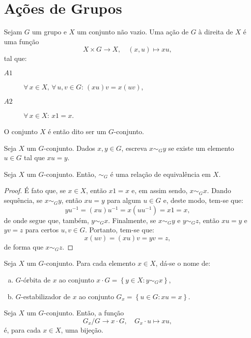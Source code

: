 \section{Ações de Grupos}\label{sec:ações-de-grupos}

\begin{definition}
  Sejam $G$ um grupo e $X$ um conjunto não vazio. Uma ação de $G$ à direita de $X$ é uma função
  \[
    X\times{G}\to{X},\quad{(x,u)\mapsto{xu}},
  \]
  tal que:
  \begin{description}
    \item[$A1$] $\forall\,x\in{X},\,\forall\,u,v\in{G}$: $(xu)v=x(uv)$,
    \item[$A2$] $\forall\,x\in{X}$: $x1=x$.
  \end{description}
  O conjunto $X$ é então dito ser um $G$-conjunto.
\end{definition}

Seja $X$ um $G$-conjunto. Dados $x,y\in{G}$, escreva $x\sim_{G}{y}$ se existe um elemento $u\in{G}$ tal que $xu=y$.

\begin{proposition}
  Seja $X$ um $G$-conjunto. Então, $\sim_{G}$ é uma relação de equivalência em $X$.
\end{proposition}

\begin{proof}
  É fato que, se $x\in{X}$, então $x1=x$ e, em assim sendo, $x\sim_{G}x$. Dando sequência, se $x\sim_{G}y$, então $xu=y$ para algum $u\in{G}$ e, deste modo, tem-se que:
  \[
    yu^{-1}=(xu)u^{-1}=x(uu^{-1})=x1=x,
  \]
  de onde segue que, também, $y\sim_{G}x$. Finalmente, se $x\sim_{G}y$ e $y\sim_{G}z$, então $xu=y$ e $yv=z$ para certos $u,v\in{G}$. Portanto, tem-se que:
  \[
    x(uv)=(xu)v=yv=z,
  \]
  de forma que $x\sim_{G}z$.
\end{proof}

\begin{definition}
  Seja $X$ um $G$-conjunto. Para cada elemento $x\in{X}$, dá-se o nome de:
  \begin{enumerate}[a)]
    \item $G$-órbita de $x$ ao conjunto $x\cdot{G}=\left\{y\in{X}:y\sim_{G}x\right\}$,
    \item $G$-estabilizador de $x$ ao conjunto $G_{x}=\left\{u\in{G}:xu=x\right\}$.
  \end{enumerate}
\end{definition}

\begin{proposition}
  Seja $X$ um $G$-conjunto. Então, a função
  \[
    G_{x}/G\to{x\cdot{G}},\quad{G_{x}\cdot{u}\mapsto{xu}},
  \]
  é, para cada $x\in{X}$, uma bijeção.
\end{proposition}

